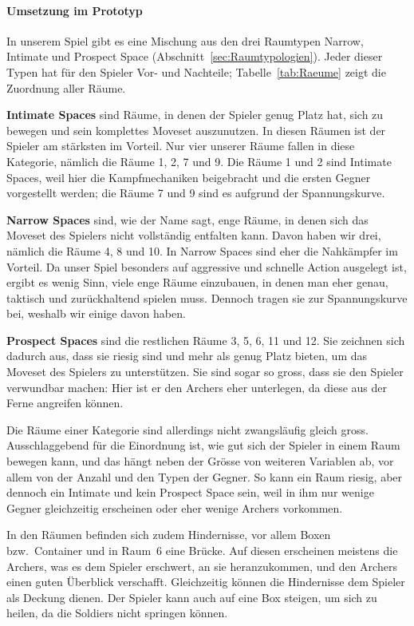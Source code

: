 \documentclass[../Main.tex]{subfiles}
\begin{document}
\paragraph{Umsetzung im Prototyp}
In unserem Spiel gibt es eine Mischung aus den drei Raumtypen Narrow, Intimate und Prospect Space (Abschnitt~\ref{sec:Raumtypologien}). Jeder dieser Typen hat für den Spieler Vor- und Nachteile; Tabelle~\ref{tab:Raeume} zeigt die Zuordnung aller Räume.

\textbf{Intimate Spaces} sind Räume, in denen der Spieler genug Platz hat, sich zu bewegen und sein komplettes Moveset auszunutzen. In diesen Räumen ist der Spieler am stärksten im Vorteil. Nur vier unserer Räume fallen in diese Kategorie, nämlich die Räume 1, 2, 7 und 9. Die Räume 1 und 2 sind Intimate Spaces, weil hier die Kampfmechaniken beigebracht und die ersten Gegner vorgestellt werden; die Räume 7 und 9 sind es aufgrund der Spannungskurve.

\textbf{Narrow Spaces} sind, wie der Name sagt, enge Räume, in denen sich das Moveset des Spielers nicht vollständig entfalten kann. Davon haben wir drei, nämlich die Räume 4, 8 und 10. In Narrow Spaces sind eher die Nahkämpfer im Vorteil. Da unser Spiel besonders auf aggressive und schnelle Action ausgelegt ist, ergibt es wenig Sinn, viele enge Räume einzubauen, in denen man eher genau, taktisch und zurückhaltend spielen muss. Dennoch tragen sie zur Spannungskurve bei, weshalb wir einige davon haben.

\textbf{Prospect Spaces} sind die restlichen Räume 3, 5, 6, 11 und 12. Sie zeichnen sich dadurch aus, dass sie riesig sind und mehr als genug Platz bieten, um das Moveset des Spielers zu unterstützen. Sie sind sogar so gross, dass sie den Spieler verwundbar machen: Hier ist er den Archers eher unterlegen, da diese aus der Ferne angreifen können.

Die Räume einer Kategorie sind allerdings nicht zwangsläufig gleich gross. Ausschlaggebend für die Einordnung ist, wie gut sich der Spieler in einem Raum bewegen kann, und das hängt neben der Grösse von weiteren Variablen ab, vor allem von der Anzahl und den Typen der Gegner. So kann ein Raum riesig, aber dennoch ein Intimate und kein Prospect Space sein, weil in ihm nur wenige Gegner gleichzeitig erscheinen oder eher wenige Archers vorkommen.

In den Räumen befinden sich zudem Hindernisse, vor allem Boxen bzw.\ Container und in Raum~6 eine Brücke. Auf diesen erscheinen meistens die Archers, was es dem Spieler erschwert, an sie heranzukommen, und den Archers einen guten Überblick verschafft. Gleichzeitig können die Hindernisse dem Spieler als Deckung dienen. Der Spieler kann auch auf eine Box steigen, um sich zu heilen, da die Soldiers nicht springen können.
\end{document}
